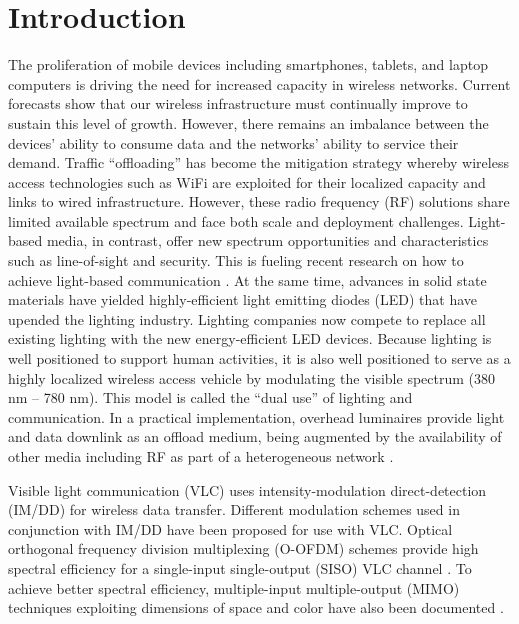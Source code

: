 \documentclass[10pt,letterpaper]{article}
\begin{document}
\section{Introduction}\label{sINTR}

The proliferation of mobile devices including smartphones, tablets,
and laptop computers is driving the need for increased capacity in
wireless networks. Current forecasts \cite{cis14a} show that our
wireless infrastructure must continually improve to sustain this level
of growth. However, there remains an imbalance between the devices'
ability to consume data and the networks' ability to service their
demand. Traffic ``offloading'' has become the mitigation strategy
whereby wireless access technologies such as WiFi are exploited for their
localized capacity and links to wired infrastructure. However, these
radio frequency (RF) solutions share limited available spectrum and face both scale and
deployment challenges.  Light-based media, in contrast, offer new
spectrum opportunities and characteristics such as line-of-sight and
security. This is fueling recent research on how to achieve
light-based communication \cite{elg11a}. At the same time, advances in solid state
materials have yielded highly-efficient light emitting diodes (LED) that have upended the lighting industry. Lighting companies now compete to replace all
existing lighting with the new energy-efficient LED devices. Because
lighting is well positioned to support human activities, it is also
well positioned to serve as a highly localized wireless access vehicle by modulating the visible spectrum (380 nm -- 780 nm). This model is called the ``dual
use'' of lighting and communication.  In a practical implementation,
overhead luminaires provide light and data downlink as an offload
medium, being augmented by the availability of other media including
RF as part of a heterogeneous network \cite{gan13a,rah15a}. 

Visible light communication (VLC) uses intensity-modulation
direct-detection (IM/DD) for wireless data transfer. Different modulation schemes used in conjunction with IM/DD have been
proposed for use with VLC. Optical orthogonal frequency division
multiplexing (O-OFDM) schemes provide high spectral efficiency for a
single-input single-output (SISO) VLC channel \cite{arm09a}. To
achieve better spectral efficiency, multiple-input multiple-output
(MIMO) techniques exploiting dimensions of space and color have also
been documented \cite{but14b,cskxy,but12a}.
\end{document}
